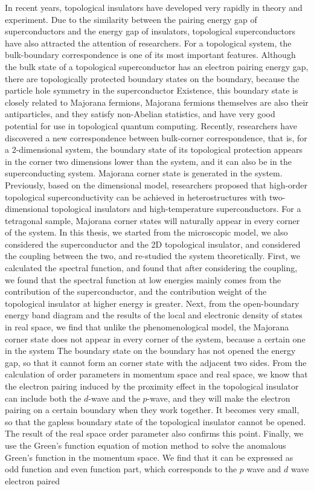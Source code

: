  In recent years, topological insulators have developed very rapidly in theory and experiment. Due to the similarity between the pairing energy gap of superconductors and the energy gap of insulators, topological superconductors have also attracted the attention of researchers. For a topological system, the bulk-boundary correspondence is one of its most important features. Although the bulk state of a topological superconductor has an electron pairing energy gap, there are topologically protected boundary states on the boundary, because the particle hole symmetry in the superconductor Existence, this boundary state is closely related to Majorana fermions, Majorana fermions themselves are also their antiparticles, and they satisfy non-Abelian statistics, and have very good potential for use in topological quantum computing. Recently, researchers have discovered a new correspondence between bulk-corner correspondence, that is, for a 2-dimensional system, the boundary state of its topological protection appears in the corner two dimensions lower than the system, and it can also be in the superconducting system. Majorana corner state is generated in the system. Previously, based on the dimensional model, researchers proposed that high-order topological superconductivity can be achieved in heterostructures with two-dimensional topological insulators and high-temperature superconductors. For a tetragonal sample, Majorana corner states will naturally appear in every corner of the system. In this thesis, we started from the microscopic model, we also considered the superconductor and the 2D topological insulator, and considered the coupling between the two, and re-studied the system theoretically. First, we calculated the spectral function, and found that after considering the coupling, we found that the spectral function at low energies mainly comes from the contribution of the superconductor, and the contribution weight of the topological insulator at higher energy is greater. Next, from the open-boundary energy band diagram and the results of the local and electronic density of states in real space, we find that unlike the phenomenological model, the Majorana corner state does not appear in every corner of the system, because a certain one in the system The boundary state on the boundary has not opened the energy gap, so that it cannot form an corner state with the adjacent two sides. From the calculation of order parameters in momentum space and real space, we know that the electron pairing induced by the proximity effect in the topological insulator can include both the $d$-wave and the $p$-wave, and they will make the electron pairing on a certain boundary when they work together. It becomes very small, so that the gapless boundary state of the topological insulator cannot be opened. The result of the real space order parameter also confirms this point. Finally, we use the Green's function equation of motion method to solve the anomalous Green's function in the momentum space. We find that it can be expressed as odd function and even function part, which corresponds to the $p$ wave and $d$ wave electron paired 